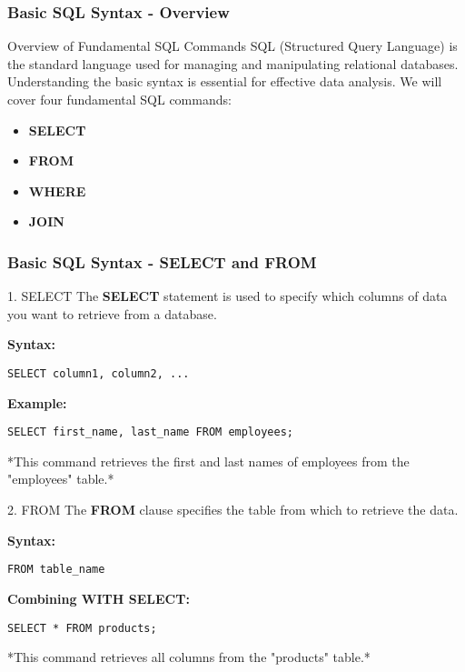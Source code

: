 \documentclass{beamer}
\begin{document}
\begin{frame}[fragile]
    \frametitle{Basic SQL Syntax - Overview}
    \begin{block}{Overview of Fundamental SQL Commands}
        SQL (Structured Query Language) is the standard language used for managing and manipulating relational databases. Understanding the basic syntax is essential for effective data analysis. We will cover four fundamental SQL commands:
        \begin{itemize}
            \item \textbf{SELECT}
            \item \textbf{FROM}
            \item \textbf{WHERE}
            \item \textbf{JOIN}
        \end{itemize}
    \end{block}
\end{frame}

\begin{frame}[fragile]
    \frametitle{Basic SQL Syntax - SELECT and FROM}
    \begin{block}{1. SELECT}
        The \textbf{SELECT} statement is used to specify which columns of data you want to retrieve from a database. 

        \textbf{Syntax:}
        \begin{lstlisting}
SELECT column1, column2, ...
        \end{lstlisting}

        \textbf{Example:}
        \begin{lstlisting}
SELECT first_name, last_name FROM employees;
        \end{lstlisting}
        *This command retrieves the first and last names of employees from the "employees" table.*
    \end{block}
    
    \begin{block}{2. FROM}
        The \textbf{FROM} clause specifies the table from which to retrieve the data.

        \textbf{Syntax:}
        \begin{lstlisting}
FROM table_name
        \end{lstlisting}

        \textbf{Combining WITH SELECT:}
        \begin{lstlisting}
SELECT * FROM products;
        \end{lstlisting}
        *This command retrieves all columns from the "products" table.*
    \end{block}
\end{frame}
\end{document}
